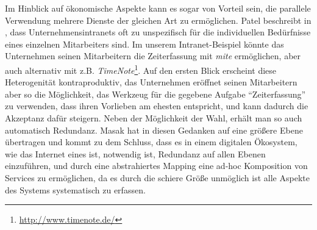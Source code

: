 Im Hinblick auf ökonomische Aspekte kann es sogar von Vorteil sein, die parallele Verwendung mehrere Dienste der gleichen Art zu ermöglichen. Patel beschreibt in \cite[S.29]{pl-depintra}, dass Unternehmensintranets oft zu unspezifisch für die individuellen Bedürfnisse eines einzelnen Mitarbeiters sind. Im unserem Intranet-Beispiel könnte das Unternehmen seinen Mitarbeitern die Zeiterfassung mit \emph{mite} ermöglichen, aber auch alternativ mit z.B. \emph{TimeNote}\footnote{\url{http://www.timenote.de/}}. Auf den ersten Blick erscheint diese Heterogenität kontraproduktiv, das Unternehmen eröffnet seinen Mitarbeitern aber so die Möglichkeit, das Werkzeug für die gegebene Aufgabe "`Zeiterfassung"' zu verwenden, dass ihren  Vorlieben am ehesten entspricht, und kann dadurch die Akzeptanz dafür steigern. Neben der Möglichkeit der Wahl, erhält man so auch automatisch Redundanz. Masak hat in \cite[S.236ff]{mkdigioe} diesen Gedanken auf eine größere Ebene übertragen und kommt zu dem Schluss, dass es in einem digitalen Ökosystem, wie das Internet eines ist, notwendig ist, Redundanz auf allen Ebenen einzuführen, und durch eine abstrahiertes Mapping eine ad-hoc Komposition von Services zu ermöglichen, da es durch die schiere Größe unmöglich ist alle Aspekte des Systems systematisch zu erfassen.
